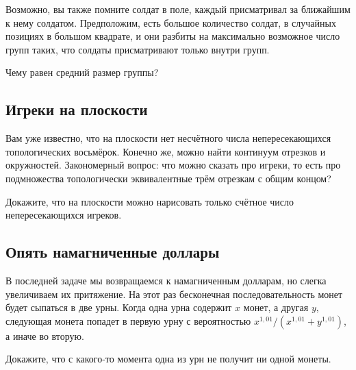 Возможно, вы также помните солдат в поле, каждый присматривал за ближайшим к нему солдатом.
Предположим, есть большое количество солдат, в случайных позициях в большом квадрате, и они разбиты на максимально возможное число групп таких, что солдаты присматривают только внутри групп.

Чему равен средний размер группы?

\subsection*{Игреки на плоскости}

Вам уже известно, что на плоскости нет несчётного числа непересекающихся топологических восьмёрок.
Конечно же, можно найти континуум отрезков и окружностей.
Закономерный вопрос: что можно сказать про игреки, то есть про подмножества топологически эквивалентные трём отрезкам с общим концом?

Докажите, что на плоскости можно нарисовать только счётное число непересекающихся игреков.

\subsection*{Опять намагниченные доллары}

В последней задаче мы возвращаемся к намагниченным долларам, но слегка увеличиваем их притяжение.
На этот раз бесконечная последовательность монет будет сыпаться в две урны.
Когда одна урна содержит $x$ монет, а другая $y$, следующая монета попадет в первую урну с вероятностью $x^{1{,}01}/(x^{1{,}01}+y^{1{,}01})$, а иначе во вторую.

Докажите, что с какого-то момента одна из урн не получит ни одной монеты.
